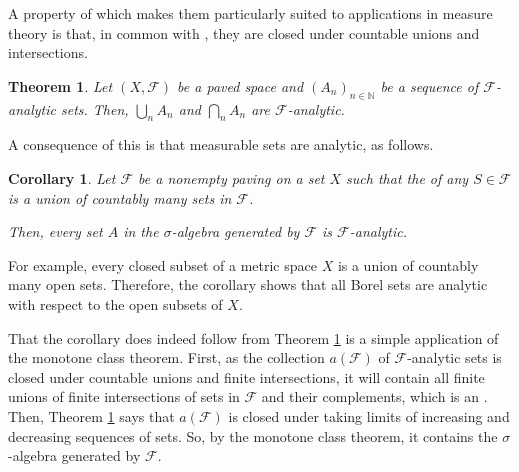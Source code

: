 \documentclass[12pt]{article}
\newtheorem*{corollary*}{Corollary}
\newtheorem{theorem}{Theorem}
\begin{document}

A property of  which makes them particularly suited to applications in measure theory is that, in common with , they are closed under countable unions and intersections.

\begin{theorem}\label{thm:1}
Let $(X,\mathcal{F})$ be a paved space and $(A_n)_{n\in\mathbb{N}}$ be a sequence of $\mathcal{F}$-analytic sets. Then, $\bigcup_nA_n$ and $\bigcap_n A_n$ are $\mathcal{F}$-analytic.
\end{theorem}

A consequence of this is that measurable sets are analytic, as follows.

\begin{corollary*}
Let $\mathcal{F}$ be a nonempty paving on a set $X$ such that the  of any $S\in\mathcal{F}$ is a union of countably many sets in $\mathcal{F}$.

Then, every set $A$ in the $\sigma$-algebra generated by $\mathcal{F}$ is $\mathcal{F}$-analytic.
\end{corollary*}

For example, every closed subset of a metric space $X$ is a union of countably many open sets. Therefore, the corollary shows that all Borel sets are analytic with respect to the open subsets of $X$.

That the corollary does indeed follow from Theorem \ref{thm:1} is a simple application of the monotone class theorem.
First, as the collection $a(\mathcal{F})$ of $\mathcal{F}$-analytic sets is closed under countable unions and finite intersections, it will contain all finite unions of finite intersections of sets in $\mathcal{F}$ and their complements, which is an . Then, Theorem \ref{thm:1} says that $a(\mathcal{F})$ is closed under taking limits of increasing and decreasing sequences of sets. So, by the monotone class theorem, it contains the $\sigma$-algebra generated by $\mathcal{F}$.

\end{document}
